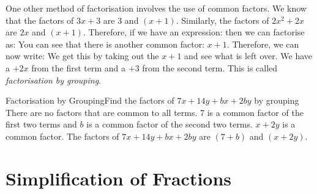 \documentclass[10pt,a4paper,titlepage,twoside,openright]{report}
\begin{document}
One other method of factorisation involves the use of common factors. We know that the factors of $3x+3$ are $3$ and $(x+1)$. Similarly, the factors of $2x^2+2x$ are $2x$ and $(x+1)$. Therefore, if we have an expression:
then we can factorise as:
You can see that there is another common factor: $x+1$. Therefore, we can now write:
We get this by taking out the $x+1$ and see what is left over. We have a $+2x$ from the first term and a $+3$ from the second term. This is called \textit{factorisation by grouping}.

\begin{wex}{Factorisation by Grouping}{Find the factors of $7x + 14y + bx + 2by$ by grouping}{
There are no factors that are common to all terms.
7 is a common factor of the first two terms and $b$ is a common factor of the second two terms.
$x+2y$ is a common factor.
The factors of $7x + 14y + bx + 2by$ are $(7+b)$ and $(x+2y)$.
}\end{wex}


\section{Simplification of Fractions}
\end{document}
